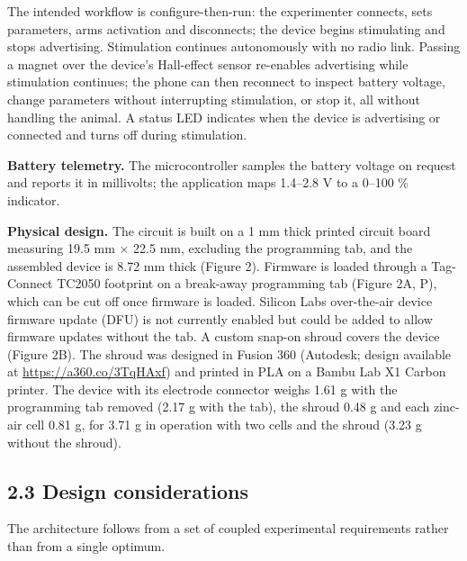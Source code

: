 The intended workflow is configure-then-run: the experimenter connects, sets parameters, arms activation and disconnects; the device begins stimulating and stops advertising. Stimulation continues autonomously with no radio link. Passing a magnet over the device's Hall-effect sensor re-enables advertising while stimulation continues; the phone can then reconnect to inspect battery voltage, change parameters without interrupting stimulation, or stop it, all without handling the animal. A status LED indicates when the device is advertising or connected and turns off during stimulation.

\textbf{Battery telemetry.} The microcontroller samples the battery voltage on request and reports it in millivolts; the application maps 1.4--2.8 V to a 0--100 \% indicator.

\textbf{Physical design.} The circuit is built on a 1 mm thick printed circuit board measuring 19.5 mm × 22.5 mm, excluding the programming tab, and the assembled device is 8.72 mm thick (Figure 2). Firmware is loaded through a Tag-Connect TC2050 footprint on a break-away programming tab (Figure 2A, P), which can be cut off once firmware is loaded. Silicon Labs over-the-air device firmware update (DFU) is not currently enabled but could be added to allow firmware updates without the tab. A custom snap-on shroud covers the device (Figure 2B). The shroud was designed in Fusion 360 (Autodesk; design available at \url{https://a360.co/3TqHAxf}) and printed in PLA on a Bambu Lab X1 Carbon printer. The device with its electrode connector weighs 1.61 g with the programming tab removed (2.17 g with the tab), the shroud 0.48 g and each zinc-air cell 0.81 g, for 3.71 g in operation with two cells and the shroud (3.23 g without the shroud).

\subsection{2.3 Design considerations}\label{design-considerations}

The architecture follows from a set of coupled experimental requirements rather than from a single optimum.

